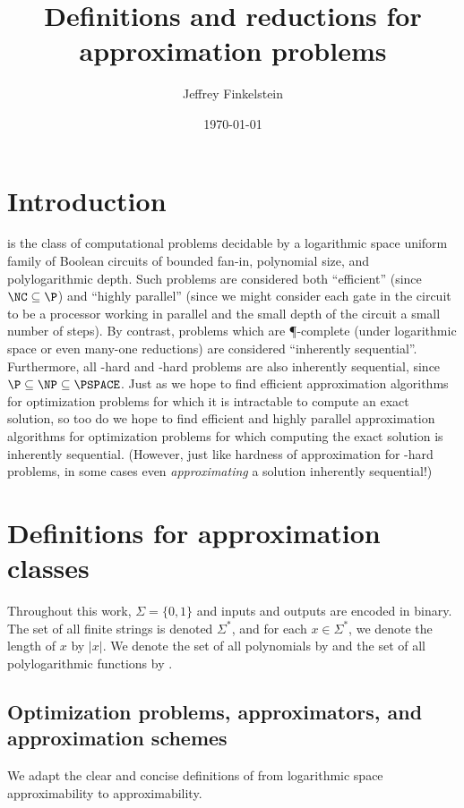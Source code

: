 \documentclass[]{article}
\author{Jef{}frey Finkelstein}
\date{\today}
\title{Definitions and reductions for \texorpdfstring{\NC}{NC} approximation problems}
\theoremstyle{plain}
\theoremstyle{definition}
\begin{document}
\maketitle

\section{Introduction}

\NC{} is the class of computational problems decidable by a logarithmic space uniform family of Boolean circuits of bounded fan-in, polynomial size, and polylogarithmic depth.
Such problems are considered both ``efficient'' (since $\NC \subseteq \P$) and ``highly parallel'' (since we might consider each gate in the circuit to be a processor working in parallel and the small depth of the circuit a small number of steps).
By contrast, problems which are \P-complete (under logarithmic space or even \NC{} many-one reductions) are considered ``inherently sequential''.
Furthermore, all \NP-hard and \PSPACE-hard problems are also inherently sequential, since $\P \subseteq \NP \subseteq \PSPACE$.
Just as we hope to find efficient approximation algorithms for optimization problems for which it is intractable to compute an exact solution, so too do we hope to find efficient and highly parallel approximation algorithms for optimization problems for which computing the exact solution is inherently sequential.
(However, just like hardness of approximation for \NP-hard problems, in some cases even \emph{approximating} a solution inherently sequential!)

\section{Definitions for \texorpdfstring{\NC}{NC} approximation classes}

Throughout this work, $\Sigma=\{0, 1\}$ and inputs and outputs are encoded in binary.
The set of all finite strings is denoted $\Sigma^*$, and for each $x\in\Sigma^*$, we denote the length of $x$ by $|x|$.
We denote the set of all polynomials by \poly{} and the set of all polylogarithmic functions by \polylog.

\subsection{Optimization problems, approximators, and approximation schemes}

We adapt the clear and concise definitions of \cite{tantau07} from logarithmic space approximability to \NC{} approximability.
\end{document}
